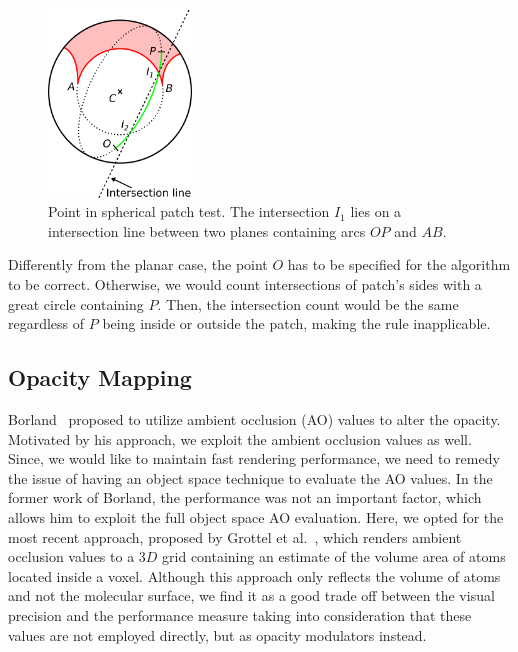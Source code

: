 \begin{figure}[htb]
  \centering
  \includegraphics[width=1.5in]{image/patch.png}
  \caption{Point in spherical patch test. The intersection $I_1$ lies on a intersection line between two planes containing arcs $OP$ and $AB$.}
	\label{fig:spherical-patch}
\end{figure}

Differently from the planar case, the point $O$ has to be specified for the algorithm to be correct.
Otherwise, we would count intersections of patch's sides with a great circle containing $P$.
Then, the intersection count would be the same regardless of $P$ being inside or outside the patch, making the rule inapplicable.

\subsection{Opacity Mapping}
Borland~\cite{borland2011ambient} proposed to utilize ambient occlusion (AO) values to alter the opacity. Motivated by his approach, we exploit the ambient occlusion values as well. Since, we would like to maintain fast rendering performance, we need to remedy the issue of having an object space technique to evaluate the AO values. In the former work of Borland, the performance was not an important factor, which allows him to exploit the full object space AO evaluation. Here, we opted for the most recent approach, proposed by Grottel et al.~\cite{grottel2012object}, which renders ambient occlusion values to a $3D$ grid containing an estimate of the volume area of atoms located inside a voxel. Although this approach only reflects the volume of atoms and not the molecular surface, we find it as a good trade off between the visual precision and the performance measure taking into consideration that these values are not employed directly, but as opacity modulators instead.
	
